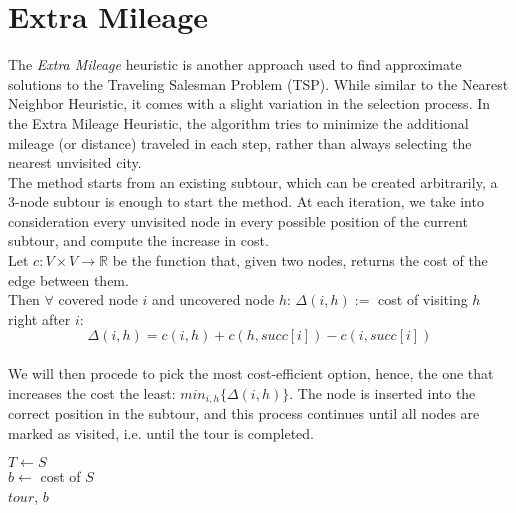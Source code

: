 \section{Extra Mileage}

The \textit{Extra Mileage} heuristic is another approach used to find approximate solutions to the Traveling Salesman Problem (TSP).
While similar to the Nearest Neighbor Heuristic, it comes with a slight variation in the selection process. 
In the Extra Mileage Heuristic, the algorithm tries to minimize the additional mileage (or distance) traveled in each step, 
rather than always selecting the nearest unvisited city.\\
The method starts from an existing subtour, which can be created arbitrarily, a 3-node subtour is enough to start the method.
At each iteration, we take into consideration every unvisited node in every possible position of the current subtour, and compute the
increase in cost.\\
Let $c : V \times V \rightarrow \mathbb{R}$ be the function that, given two nodes, returns the cost of the edge between them.\\
Then $\forall$ covered node $i$ and uncovered node $h$: $\Delta(i,h) := $ cost of visiting $h$ right after $i$:\\

\begin{equation}
    \Delta(i,h) = c(i,h) + c(h, succ[i]) - c(i, succ[i])
\end{equation}\\

We will then procede to pick the most cost-efficient option, hence, the one that increases the cost the least: $min_{i,h}\{\Delta(i,h)\}$.
The node is inserted into the correct position in the subtour, and this process continues until all nodes are marked as visited, i.e. until the tour is completed.\\ 

\begin{algorithm}[H]
    \BlankLine
    $T \gets S$\\
    $b \gets$ cost of $S$\\
    \Return $tour$, $b$\\
    
\end{algorithm}


